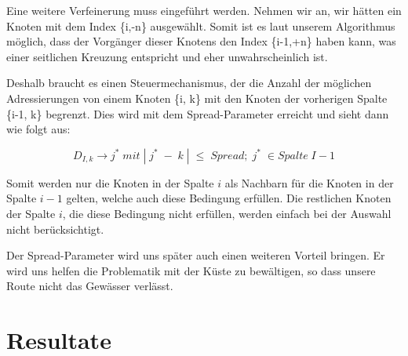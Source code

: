 \documentclass[a4paper,10pt]{article}
\begin{document}
Eine weitere Verfeinerung muss eingeführt werden. Nehmen wir an, wir hätten ein
Knoten mit dem Index \{i,-n\} ausgewählt. Somit ist es laut unserem Algorithmus
möglich, dass der Vorgänger dieser Knotens den Index \{i-1,+n\} haben kann, was
einer seitlichen Kreuzung entspricht und eher unwahrscheinlich ist.

Deshalb braucht es einen Steuermechanismus, der die Anzahl der möglichen
Adressierungen von einem Knoten \{i, k\} mit den Knoten der vorherigen Spalte
\{i-1, k\} begrenzt. Dies wird mit dem Spread-Parameter erreicht und sieht dann
wie folgt aus:

\begin{equation}
\label{eq_dyn:7}
D_{I,k} \to j^*\; mit\; |\;j^*\;-\;k\;| \;\le\; Spread;\; j^*\; \in Spalte\; I-1
\end{equation}
 
Somit werden nur die Knoten in der Spalte \(i\) als Nachbarn für die Knoten in
der Spalte \(i-1\) gelten, welche auch diese Bedingung erfüllen. Die restlichen
Knoten der Spalte \(i\), die diese Bedingung nicht erfüllen, werden einfach bei
der Auswahl nicht berücksichtigt.

Der Spread-Parameter wird uns später auch einen weiteren Vorteil bringen. Er
wird uns helfen die Problematik mit der Küste zu bewältigen, so dass
unsere Route nicht das Gewässer verlässt.






\newpage
\part{Resultate}


\end{document}
